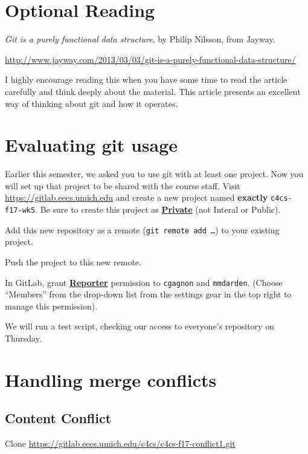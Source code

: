 \documentclass{article}
\begin{document}


\section*{Optional Reading}

\emph{Git is a purely functional data structure}, by Philip Nilsson, from Jayway.

\url{http://www.jayway.com/2013/03/03/git-is-a-purely-functional-data-structure/}

I highly encourage reading this when you have some time to read the article
carefully and think deeply about the material.
This article presents an excellent way of thinking about git and how it
operates.



\section{Evaluating git usage}

Earlier this semester, we asked you to use git with at least one project. Now
you will set up that project to be shared with the course staff. Visit
\url{https://gitlab.eecs.umich.edu} and create a new project named
\textbf{exactly} \texttt{c4cs-f17-wk5}.
Be sure to create this project as
\textbf{\ul{Private}} (not Interal or Public).

Add this new repository as a remote (\texttt{git remote add \dots}) to your
existing project.

Push the project to this new remote.

In GitLab, grant \textbf{\ul{Reporter}} permission to \texttt{cgagnon} and
\texttt{mmdarden}.
(Choose ``Members'' from the drop-down list from the settings gear in the top
right to manage this permission).

We will run a test script, checking our access to everyone's repository on
Thursday.


\newpage
\section{Handling merge conflicts}

\subsection{Content Conflict}

Clone \url{https://gitlab.eecs.umich.edu/c4cs/c4cs-f17-conflict1.git}
\end{document}
